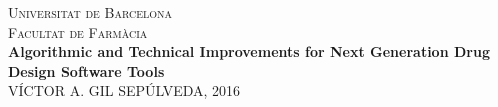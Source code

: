 
\newcommand{\HRule}{\rule{\linewidth}{0.5mm}} %

\center %
 

\textsc{\LARGE Universitat de Barcelona}\\[1.5cm] %
\textsc{\Large Facultat de Farm\`acia}\\[0.5cm] %

\vspace{2.5cm}
{ 
\huge \bfseries Algorithmic and Technical Improvements
for Next Generation Drug Design Software
Tools
}\\[0.4cm] %


\vspace{10cm}
V\'ICTOR A. GIL SEP\'ULVEDA, 2016

\vfill %
